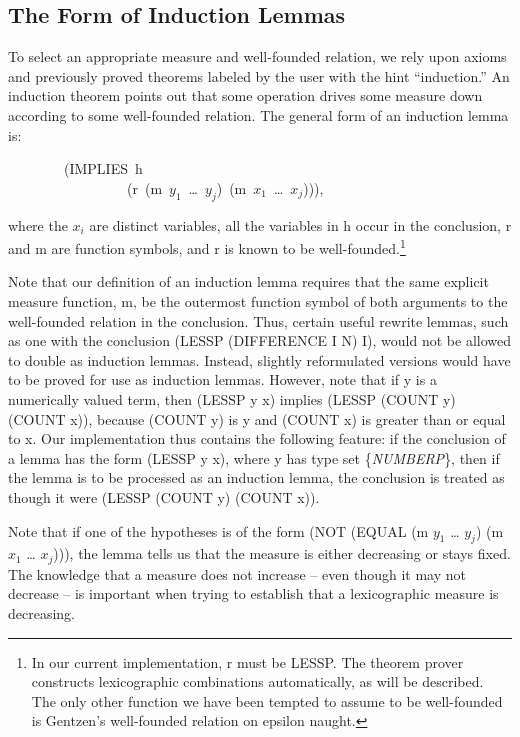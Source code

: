 \documentclass[11pt]{book}
\newenvironment{pubasis}{\begin{flushleft}\ttfamily\small}{\normalsize\rmfamily\end{flushleft}}
\newcommand{\pubinlineunderline}[1]{\emph{#1}}
\newcommand{\pubdefaulttextsize}{\large}
\begin{document}
\subsection{The Form of Induction Lemmas}
\pubdefaulttextsize
To select an appropriate measure and well-founded relation, we rely
upon axioms and previously proved theorems labeled by the user with the
hint ``induction.''
An induction theorem
points out that some operation drives some measure down according to
some well-founded relation.  The general form of an
induction lemma is:
\begin{pubasis}
~~~~~~~~(IMPLIES~h\\
~~~~~~~~~~~~~~~~~(r~(m~$y_{1}$~\ldots{}~$y_{j}$)~(m~$x_{1}$~\ldots{}~$x_{j}$))),\\
\end{pubasis}
where the $x_{i}$ are distinct variables, all the variables in
h occur in the conclusion, r and m are function symbols, and r is known to be
well-founded.\footnote{In our current implementation, r must be LESSP.  The theorem prover constructs lexicographic combinations automatically, as will be described.  The only other function we have been tempted to assume to be well-founded is Gentzen's \cite{GENTZEN} well-founded relation on epsilon naught.}

Note that our
definition of an induction lemma requires that
the same explicit measure function, m, be the outermost function
symbol of both arguments to the well-founded relation in the conclusion.
Thus, certain useful
rewrite lemmas, such as one with the conclusion
(LESSP (DIFFERENCE I N) I),
would not be allowed to double as induction lemmas.  Instead, slightly
reformulated versions would have to be proved for use as induction lemmas.
However, note that if y is a numerically valued term,
then (LESSP y x) implies
(LESSP (COUNT y) (COUNT x)), because (COUNT y) is y and (COUNT x) is
greater than or equal to x.  Our implementation thus contains the following
feature:  if the conclusion of a lemma
has the form (LESSP y x), where y
has type set \{\pubinlineunderline{NUMBERP}\}, then if the lemma is to be processed as an induction
lemma, the conclusion is treated as though it were
(LESSP (COUNT y) (COUNT x)).

Note that if one of the hypotheses is of the form (NOT (EQUAL (m $y_{1}$ \ldots{} $y_{j}$)
(m $x_{1}$ \ldots{} $x_{j}$))), the lemma tells us that the measure is either decreasing
or stays fixed.  The knowledge that a measure
does not increase -- even though it may not decrease --
is important when trying to establish that a lexicographic measure is
decreasing.
\end{document}
